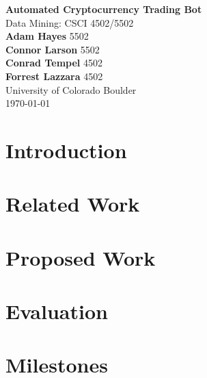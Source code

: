 \documentclass[11pt]{article}
\begin{document}
\begin{titlepage}
   \begin{center}
       \vspace*{1cm}
       \textbf{\huge Automated Cryptocurrency Trading Bot} \\
       \vspace{1cm}
        {\large Data Mining: CSCI 4502/5502} \\
       \vspace{1.5cm}
       \textbf{Adam Hayes} 5502 \\
       \textbf{Connor Larson} 5502 \\
       \textbf{Conrad Tempel} 4502 \\
       \textbf{Forrest Lazzara} 4502 \\
       \vfill
       {\large University of Colorado Boulder}\\
       \vspace{0.5cm}
       \today
            
   \end{center}
\end{titlepage}

\section{Introduction}

\section{Related Work}

\section{Proposed Work}

\section{Evaluation}

\section{Milestones}
\end{document}
